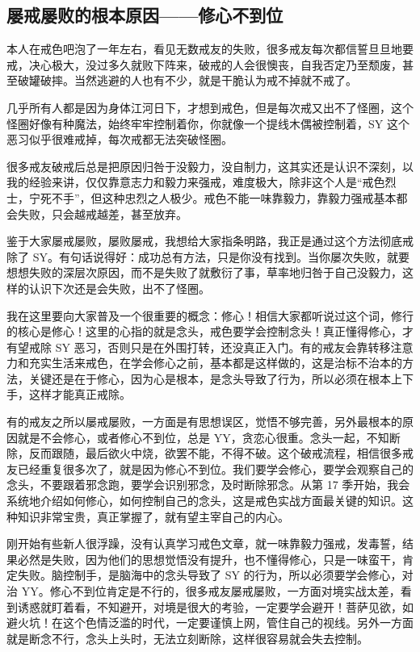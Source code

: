 \documentclass{ctexart}
\begin{document}
\subsection{屡戒屡败的根本原因——修心不到位}

本人在戒色吧泡了一年左右，看见无数戒友的失败，很多戒友每次都信誓旦旦地要戒，决心极大，没过多久就败下阵来，破戒的人会很懊丧，自我否定乃至颓废，甚至破罐破摔。当然逃避的人也有不少，就是干脆认为戒不掉就不戒了。

几乎所有人都是因为身体江河日下，才想到戒色，但是每次戒又出不了怪圈，这个怪圈好像有种魔法，始终牢牢控制着你，你就像一个提线木偶被控制着，SY 这个恶习似乎很难戒掉，每次戒都无法突破怪圈。

很多戒友破戒后总是把原因归咎于没毅力，没自制力，这其实还是认识不深刻，以我的经验来讲，仅仅靠意志力和毅力来强戒，难度极大，除非这个人是“戒色烈士，宁死不手”，但这种忠烈之人极少。戒色不能一味靠毅力，靠毅力强戒基本都会失败，只会越戒越差，甚至放弃。

鉴于大家屡戒屡败，屡败屡戒，我想给大家指条明路，我正是通过这个方法彻底戒除了 SY。有句话说得好：成功总有方法，只是你没有找到。当你屡次失败，就要想想失败的深层次原因，而不是失败了就敷衍了事，草率地归咎于自己没毅力，这样的认识下次还是会失败，出不了怪圈。

我在这里要向大家普及一个很重要的概念：修心！相信大家都听说过这个词，修行的核心是修心！这里的心指的就是念头，戒色要学会控制念头！真正懂得修心，才有望戒除 SY 恶习，否则只是在外围打转，还没真正入门。有的戒友会靠转移注意力和充实生活来戒色，在学会修心之前，基本都是这样做的，这是治标不治本的方法，关键还是在于修心，因为心是根本，是念头导致了行为，所以必须在根本上下手，这样才能真正戒除。

有的戒友之所以屡戒屡败，一方面是有思想误区，觉悟不够完善，另外最根本的原因就是不会修心，或者修心不到位，总是 YY，贪恋心很重。念头一起，不知断除，反而跟随，最后欲火中烧，欲罢不能，不得不破。这个破戒流程，相信很多戒友已经重复很多次了，就是因为修心不到位。我们要学会修心，要学会观察自己的念头，不要跟着邪念跑，要学会识别邪念，及时断除邪念。从第 17 季开始，我会系统地介绍如何修心，如何控制自己的念头，这是戒色实战方面最关键的知识。这种知识非常宝贵，真正掌握了，就有望主宰自己的内心。

刚开始有些新人很浮躁，没有认真学习戒色文章，就一味靠毅力强戒，发毒誓，结果必然是失败，因为他们的思想觉悟没有提升，也不懂得修心，只是一味蛮干，肯定失败。脑控制手，是脑海中的念头导致了 SY 的行为，所以必须要学会修心，对治 YY。修心不到位肯定是不行的，很多戒友屡戒屡败，一方面对境实战太差，看到诱惑就盯着看，不知避开，对境是很大的考验，一定要学会避开！菩萨见欲，如避火坑！在这个色情泛滥的时代，一定要谨慎上网，管住自己的视线。另外一方面就是断念不行，念头上头时，无法立刻断除，这样很容易就会失去控制。
\end{document}
